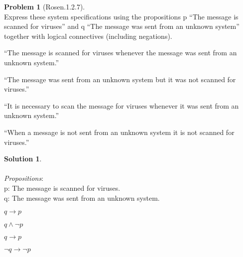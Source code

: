 \documentclass{article}
\theoremstyle{definition}
\newtheorem*{problem}{Problem}
\newtheorem*{solution}{Solution}
\begin{document}
\begin{problem}[Rosen.1.2.7
]\ \\
Express these system specifications using the propositions
p “The message is scanned for viruses” and q “The
message was sent from an unknown system” together
with logical connectives (including negations).\ \\
\begin{compactenum}
\renewcommand{\theenumi}{\alph{enumi}}
\item “The message is scanned for viruses whenever the
message was sent from an unknown system.”
\item “The message was sent from an unknown system but
it was not scanned for viruses.”
\item “It is necessary to scan the message for viruses whenever
it was sent from an unknown system.”
\item “When a message is not sent from an unknown system
it is not scanned for viruses.”
\end{compactenum}
\end{problem}

\begin{solution}\ \\
\ \\
\textit{Propositions}:\ \\
p: The message is scanned for viruses.\ \\
q: The message was sent from an unknown system.\ \\
\begin{compactenum}
\renewcommand{\theenumi}{\alph{enumi}}
\item $q \rightarrow p$
\item $q \wedge \neg p$
\item $q \rightarrow p $
\item $\neg q \rightarrow \neg p$
\end{compactenum}
\end{solution}
\end{document}
